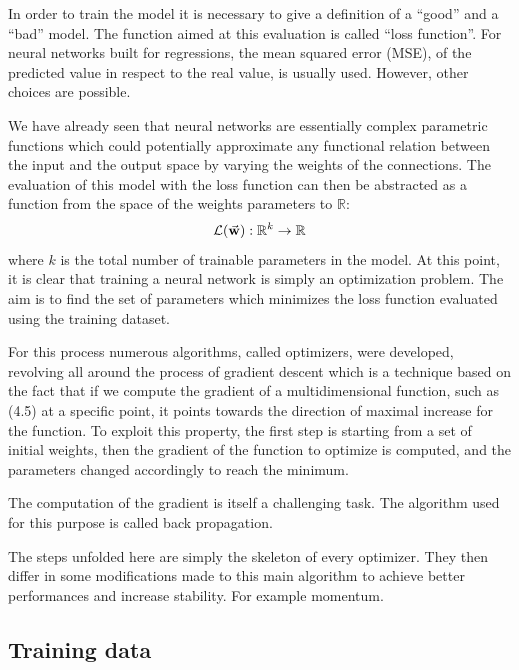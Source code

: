 \documentclass[a4paper,10pt]{report}
\begin{document}
In order to train the model it is necessary to give a definition of a ``good'' and a ``bad'' model.
The function aimed at this evaluation is called ``loss function''. For neural networks built for 
regressions, the mean squared error (MSE), of the predicted value in respect to the real value,
is usually used. However, other choices are possible.

We have already seen that neural networks are essentially complex parametric functions
which could potentially approximate any functional relation between the input and the
output space by varying the weights of the connections. The evaluation of this model
with the loss function can then be abstracted as a function from the space of the 
weights parameters to $\mathbb{R}$:
\begin{equation}
    \mathcal{L}(\va{w}): \mathbb{R}^k \rightarrow \mathbb{R}
\end{equation}
where $k$ is the total number of trainable parameters in the model.
At this point, it is clear that 
training a neural network is simply an optimization problem.
The aim is to find the set of parameters which minimizes the loss function evaluated using 
the training dataset.

For this process numerous algorithms, called optimizers, were developed, revolving all around the process of gradient descent
which is a technique based on the fact that if we compute the gradient of a multidimensional function, such as (4.5)
at a specific point, it points towards the direction of maximal increase for the function.
To exploit this property, the first step is starting from a set of initial weights, 
then the gradient of the function to optimize is computed, and the parameters changed accordingly to reach the minimum.

The computation of the gradient is itself a challenging task. The algorithm used for this purpose is called 
back propagation.

The steps unfolded here are simply the skeleton of every optimizer. They then differ in some modifications
made to this main algorithm to achieve better performances and increase stability.
For example momentum.

\subsection{Training data}

\end{document}
